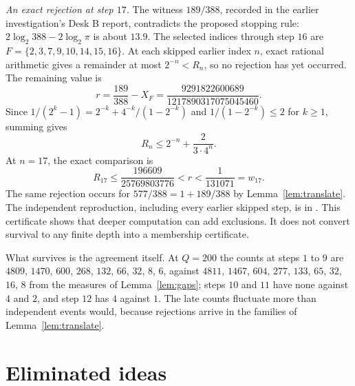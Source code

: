 \documentclass[11pt]{article}
\begin{document}
\emph{An exact rejection at step $17$.}  The witness $189/388$, recorded in the
earlier investigation's Desk B report, contradicts the proposed stopping rule:
$2\log_2 388-2\log_2\pi$ is about $13.9$.  The selected indices through step $16$
are $F=\{2,3,7,9,10,14,15,16\}$.  At each skipped earlier index $n$, exact
rational arithmetic gives a remainder at most $2^{-n}<R_n$, so no rejection
has yet occurred.  The remaining value is
\[
 r=\frac{189}{388}-X_F
  =\frac{9291822600689}{1217890317075045460}.
\]
Since $1/(2^k-1)=2^{-k}+4^{-k}/(1-2^{-k})$ and
$1/(1-2^{-k})\le2$ for $k\ge1$, summing gives
\[
 R_n\le2^{-n}+\frac{2}{3\cdot4^n}.
\]
At $n=17$, the exact comparison is
\[
 R_{17}\le\frac{196609}{25769803776}<r<\frac1{131071}=w_{17}.
\]
The same rejection occurs for $577/388=1+189/388$ by
Lemma~\ref{lem:translate}.  The independent reproduction, including every
earlier skipped step, is in
\href{\repobase/research/experiments/sparse_interpolation/late_rejection.py}
{}.
This certificate shows that deeper computation can add exclusions.  It does
not convert survival to any finite depth into a membership certificate.

What survives is the agreement itself.  At $Q=200$ the counts at steps $1$ to
$9$ are $4809$, $1470$, $600$, $268$, $132$, $66$, $32$, $8$, $6$, against
$4811$, $1467$, $604$, $277$, $133$, $65$, $32$, $16$, $8$ from the measures of
Lemma~\ref{lem:gaps}; steps $10$ and $11$ have none against $4$ and $2$, and
step $12$ has $4$ against $1$.  The late counts fluctuate more than independent
events would, because rejections arrive in the families of
Lemma~\ref{lem:translate}.

\section{Eliminated ideas}\label{sec:eliminated}
\end{document}
